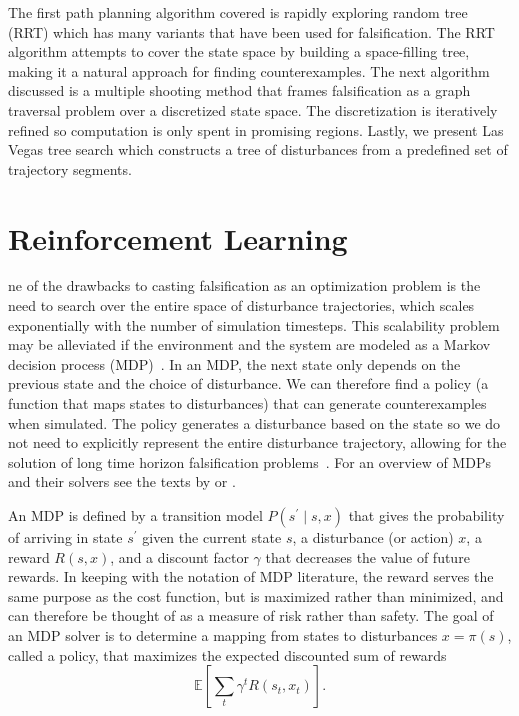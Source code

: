 The first path planning algorithm covered is rapidly exploring random tree (RRT) which has many variants that have been used for falsification. The RRT algorithm attempts to cover the state space by building a space-filling tree, making it a natural approach for finding counterexamples. The next algorithm discussed is a multiple shooting method that frames falsification as a graph traversal problem over a discretized state space. The discretization is iteratively refined so computation is only spent in promising regions. Lastly, we present Las Vegas tree search which constructs a tree of disturbances from a predefined set of trajectory segments.

\section{Reinforcement Learning}
ne of the drawbacks to casting falsification as an optimization problem is the need to search over the entire space of disturbance trajectories, which scales exponentially with the number of simulation timesteps. This scalability problem may be alleviated if the environment and the system are modeled as a Markov decision process (MDP)~\cite{dmubook}. In an MDP, the next state only depends on the previous state and the choice of disturbance. We can therefore find a policy (a function that maps states to disturbances) that can generate counterexamples when simulated. The policy generates a disturbance based on the state so we do not need to explicitly represent the entire disturbance trajectory, allowing for the solution of long time horizon falsification problems~\cite{koren2018adaptive}. For an overview of MDPs and their solvers see the texts by \textcite{dmubook} or \textcite{sutton2018reinforcement}. 

An MDP is defined by a transition model $P(s^\prime \mid s, x)$ that gives the probability of arriving in state $s^\prime$ given the current state $s$, a disturbance (or action) $x$, a reward $R(s, x)$, and a discount factor $\gamma$ that decreases the value of future rewards. In keeping with the notation of MDP literature, the reward serves the same purpose as the cost function, but is maximized rather than minimized, and can therefore be thought of as a measure of risk rather than safety. The goal of an MDP solver is to determine a mapping from states to disturbances $x = \pi(s)$, called a policy, that maximizes the expected discounted sum of rewards
\begin{equation}
    \mathbb{E}\left[ \sum_t \gamma^t R(s_t, x_t) \right] \text{.}
\end{equation}

